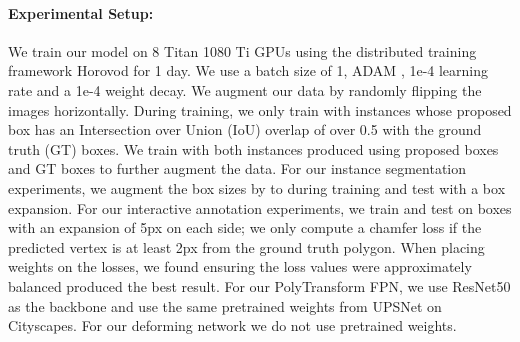 \documentclass[10pt,twocolumn,letterpaper]{article}
\begin{document}
\paragraph{Experimental Setup:}
We train our model  on 8 Titan 1080 Ti GPUs using the distributed training framework Horovod \cite{horovod} for 1 day. We use a batch size of 1, ADAM \cite{adam}, 1e-4 learning rate and a 1e-4 weight decay. We augment our data by randomly flipping the images horizontally. During training, we only train with instances whose proposed box has an Intersection over Union (IoU) overlap of over 0.5 with the ground truth (GT) boxes. We train with both instances produced using proposed boxes and GT boxes to further augment the data. For our instance segmentation experiments, we augment the box sizes by  to  during training and test with a  box expansion. For our interactive annotation experiments, we train and test on boxes with an expansion of 5px on each side;  we only compute a chamfer loss if the predicted vertex is at least 2px from the ground truth polygon. When placing weights on the losses, we found ensuring the loss values were approximately balanced produced the best result. For our PolyTransform FPN, we use ResNet50 \cite{resnet} as the backbone and use the same pretrained weights from UPSNet \cite{upsnet} on Cityscapes. For our deforming network we do not use pretrained weights.
\end{document}
